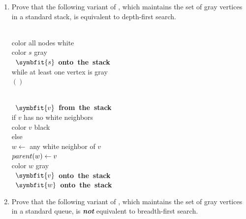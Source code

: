 \begin{exercises}
\begin{enumerate}
\item Prove that the following variant of , which maintains the set of gray vertices in a standard stack, is equivalent to depth-first search.
\begin{center}
\begin{minipage}[c]{0.47\linewidth}
\begin{pseudocode}
\\
color all nodes white\\
color $s$ gray\\
\mbox{\color{JEred}{\bfseries push} $\symbfit{s}$ {\bfseries onto the stack}}\\
while at least one vertex is gray\\
\Indent {}$()$
\end{pseudocode}
\end{minipage}\hfill
\begin{minipage}[c]{0.51\linewidth}
\begin{pseudocode}
\\
\mbox{\color{JEred}{\bfseries pop} $\symbfit{v}$ {\bfseries from the stack}}\\
if $v$ has no white neighbors\\
\Indent color $v$ black\\
else\\
\Indent $w \gets$ any white neighbor of $v$\\
\Indent $parent(w) \gets v$\\
\Indent color $w$ gray\\
\Indent \mbox{\color{JEred}{\bfseries push} $\symbfit{v}$ {\bfseries onto the stack}}\\
\Indent \mbox{\color{JEred}{\bfseries push} $\symbfit{w}$ {\bfseries onto the stack}}
\end{pseudocode}
\end{minipage}
\end{center}
\item Prove that the following variant of , which maintains the set of gray vertices in a standard queue, is \textbf{\textit{not}} equivalent to breadth-first search.

\end{enumerate}
\end{exercises}
